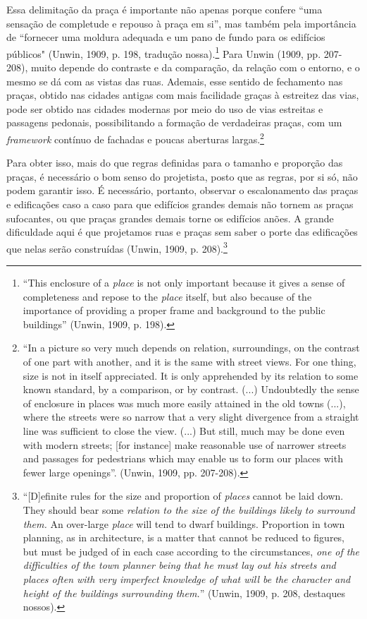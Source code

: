 \documentclass[12pt, a4paper]{book} %
\begin{document}
        Essa delimitação da praça é importante não apenas porque confere ``uma sensação de completude e repouso à praça em si'', mas também pela importância de ``fornecer uma moldura adequada e um pano de fundo para os edifícios públicos" (Unwin, 1909, p. 198, tradução nossa).\footnote[72]{``This enclosure of a \textit{place} is not only important because it gives a sense of completeness and repose to the \textit{place} itself, but also because of the importance of providing a proper frame and background to the public buildings'' (Unwin, 1909, p. 198).} Para Unwin (1909, pp. 207-208), muito depende do contraste e da comparação, da relação com o entorno, e o mesmo se dá com as vistas das ruas. Ademais, esse sentido de fechamento nas praças, obtido nas cidades antigas com mais facilidade graças à estreitez das vias, pode ser obtido nas cidades modernas por meio do uso de vias estreitas e passagens pedonais, possibilitando a formação de verdadeiras praças, com um \textit{framework} contínuo de fachadas e poucas aberturas largas.\footnote[73]{``In a picture so very much depends on relation, surroundings, on the contrast of one part with another, and it is the same with street views. For one thing, size is not in itself appreciated. It is only apprehended by its relation to some known standard, by a comparison, or by contrast. (...) Undoubtedly the sense of enclosure in places was much more easily attained in the old towns (...), where the streets were so narrow that a very slight divergence from a straight line was sufficient to close the view. (...) But still, much may be done even with modern streets; [for instance] make reasonable use of narrower streets and passages for pedestrians which may enable us to form our places with fewer large openings''. (Unwin, 1909, pp. 207-208).}

        Para obter isso, mais do que regras definidas para o tamanho e proporção das praças, é necessário o bom senso do projetista, posto que as regras, por si só, não podem garantir isso. É necessário, portanto, observar o escalonamento das praças e edificações caso a caso para que edifícios grandes demais não tornem as praças sufocantes, ou que praças grandes demais torne os edifícios anões. A grande dificuldade aqui é que projetamos ruas e praças sem saber o porte das edificações que nelas serão construídas (Unwin, 1909, p. 208).\footnote[74]{``[D]efinite rules for the size and proportion of \textit{places} cannot be laid down. They should bear some \textit{relation to the size of the buildings likely to surround them.} An over-large \textit{place} will tend to dwarf buildings. Proportion in town planning, as in architecture, is a matter that cannot be reduced to figures, but must be judged of in each case according to the circumstances, \textit{one of the difficulties of the town planner being that he must lay out his streets and places often with very imperfect knowledge of what will be the character and height of the buildings surrounding them.}'' (Unwin, 1909, p. 208, destaques nossos).}
\end{document}
